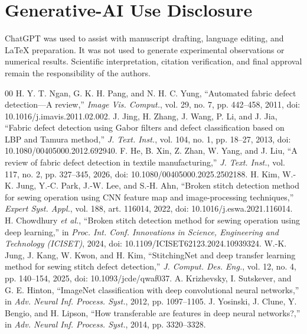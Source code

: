\documentclass[conference,a4paper]{IEEEtran}
\begin{document}
\section*{Generative-AI Use Disclosure}
ChatGPT was used to assist with manuscript drafting, language editing, and LaTeX preparation. It was not used to generate experimental observations or numerical results. Scientific interpretation, citation verification, and final approval remain the responsibility of the authors.

\begin{thebibliography}{00}
 H. Y. T. Ngan, G. K. H. Pang, and N. H. C. Yung, ``Automated fabric defect detection---A review,'' \emph{Image Vis. Comput.}, vol. 29, no. 7, pp. 442--458, 2011, doi: 10.1016/j.imavis.2011.02.002.
 J. Jing, H. Zhang, J. Wang, P. Li, and J. Jia, ``Fabric defect detection using Gabor filters and defect classification based on LBP and Tamura method,'' \emph{J. Text. Inst.}, vol. 104, no. 1, pp. 18--27, 2013, doi: 10.1080/00405000.2012.692940.
 F. He, B. Xin, Z. Zhan, W. Yang, and J. Liu, ``A review of fabric defect detection in textile manufacturing,'' \emph{J. Text. Inst.}, vol. 117, no. 2, pp. 327--345, 2026, doi: 10.1080/00405000.2025.2502188.
 H. Kim, W.-K. Jung, Y.-C. Park, J.-W. Lee, and S.-H. Ahn, ``Broken stitch detection method for sewing operation using CNN feature map and image-processing techniques,'' \emph{Expert Syst. Appl.}, vol. 188, art. 116014, 2022, doi: 10.1016/j.eswa.2021.116014.
 H. Chowdhury \emph{et al.}, ``Broken stitch detection method for sewing operation using deep learning,'' in \emph{Proc. Int. Conf. Innovations in Science, Engineering and Technology (ICISET)}, 2024, doi: 10.1109/ICISET62123.2024.10939324.
 W.-K. Jung, J. Kang, W. Kwon, and H. Kim, ``StitchingNet and deep transfer learning method for sewing stitch defect detection,'' \emph{J. Comput. Des. Eng.}, vol. 12, no. 4, pp. 140--154, 2025, doi: 10.1093/jcde/qwaf037.
 A. Krizhevsky, I. Sutskever, and G. E. Hinton, ``ImageNet classification with deep convolutional neural networks,'' in \emph{Adv. Neural Inf. Process. Syst.}, 2012, pp. 1097--1105.
 J. Yosinski, J. Clune, Y. Bengio, and H. Lipson, ``How transferable are features in deep neural networks?,'' in \emph{Adv. Neural Inf. Process. Syst.}, 2014, pp. 3320--3328.

\end{thebibliography}
\end{document}
